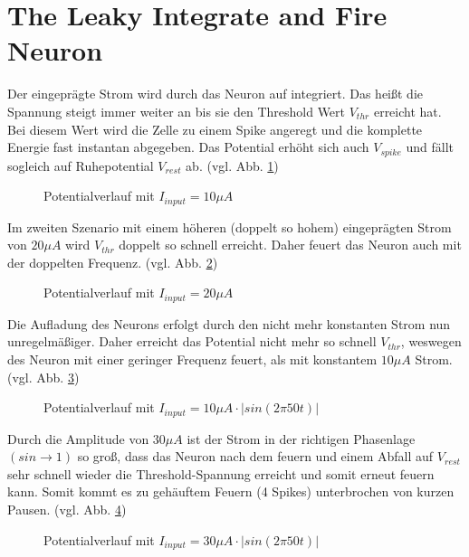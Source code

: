 \documentclass[conference]{IEEEtran}
\begin{document}
\section{The Leaky Integrate and Fire Neuron}
Der eingeprägte Strom wird durch das Neuron auf integriert. Das heißt die Spannung steigt immer weiter an bis sie den Threshold Wert $V_{thr}$ erreicht hat. Bei diesem Wert wird die Zelle zu einem Spike angeregt und die komplette Energie fast instantan abgegeben. Das Potential erhöht sich auch $V_{spike}$ und fällt sogleich auf Ruhepotential $V_{rest}$ ab. (vgl. Abb. \ref{fig:neuron1})\\
\begin{figure}[h!]
  	\centering
    \scalebox{.5}{}
    \caption{Potentialverlauf mit $I_{input} = 10\mu A$}
    \label{fig:neuron1}
\end{figure}
Im zweiten Szenario mit einem höheren (doppelt so hohem) eingeprägten Strom von $20\mu A$ wird $V_{thr}$ doppelt so schnell erreicht. Daher feuert das Neuron auch mit der doppelten Frequenz. (vgl. Abb. \ref{fig:neuron2})\\
\begin{figure}[h!]
  	\centering
    \scalebox{.5}{}
    \caption{Potentialverlauf mit $I_{input} = 20\mu A$}
    \label{fig:neuron2}
\end{figure}
Die Aufladung des Neurons erfolgt durch den nicht mehr konstanten Strom nun unregelmäßiger. Daher erreicht das Potential nicht mehr so schnell $V_{thr}$, weswegen des Neuron mit einer geringer Frequenz feuert, als mit konstantem $10\mu A$ Strom. (vgl. Abb. \ref{fig:neuron3})\\
\begin{figure}[h!]
  	\centering
    \scalebox{.5}{}
    \caption{Potentialverlauf mit $I_{input} = 10\mu A \cdot |sin(2\pi 50 t)|$}
    \label{fig:neuron3}
\end{figure}
Durch die Amplitude von $30\mu A$ ist der Strom in der richtigen Phasenlage $(sin \rightarrow 1)$ so groß, dass das Neuron nach dem feuern und einem Abfall auf $V_{rest}$ sehr schnell wieder die Threshold-Spannung erreicht und somit erneut feuern kann. Somit kommt es zu gehäuftem Feuern (4 Spikes) unterbrochen von kurzen Pausen. (vgl. Abb. \ref{fig:neuron4})
\begin{figure}[h!]
  	\centering
    \scalebox{.5}{}
    \caption{Potentialverlauf mit $I_{input} = 30\mu A \cdot |sin(2\pi 50 t)|$}
    \label{fig:neuron4}
\end{figure}
\end{document}
